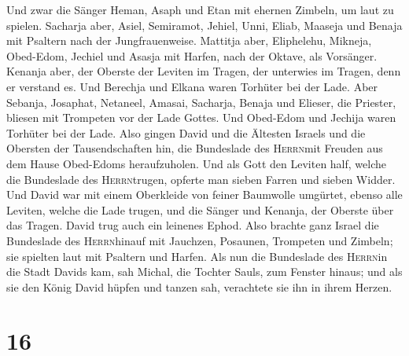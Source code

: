  Und zwar die Sänger Heman, Asaph und Etan mit ehernen
Zimbeln, um laut zu spielen.  Sacharja aber, Asiel,
Semiramot, Jehiel, Unni, Eliab, Maaseja und Benaja mit Psaltern nach der
Jungfrauenweise.  Mattitja aber, Eliphelehu, Mikneja,
Obed-Edom, Jechiel und Asasja mit Harfen, nach der Oktave, als
Vorsänger.  Kenanja aber, der Oberste der Leviten im
Tragen, der unterwies im Tragen, denn er verstand es. 
Und Berechja und Elkana waren Torhüter bei der Lade. 
Aber Sebanja, Josaphat, Netaneel, Amasai, Sacharja, Benaja und Elieser,
die Priester, bliesen mit Trompeten vor der Lade Gottes. Und Obed-Edom
und Jechija waren Torhüter bei der Lade.  Also gingen
David und die Ältesten Israels und die Obersten der Tausendschaften hin,
die Bundeslade des \textsc{Herrn}mit Freuden aus dem Hause Obed-Edoms
heraufzuholen.  Und als Gott den Leviten half, welche die
Bundeslade des \textsc{Herrn}trugen, opferte man sieben Farren und
sieben Widder.  Und David war mit einem Oberkleide von
feiner Baumwolle umgürtet, ebenso alle Leviten, welche die Lade trugen,
und die Sänger und Kenanja, der Oberste über das Tragen. David trug auch
ein leinenes Ephod.  Also brachte ganz Israel die
Bundeslade des \textsc{Herrn}hinauf mit Jauchzen, Posaunen, Trompeten
und Zimbeln; sie spielten laut mit Psaltern und Harfen. 
Als nun die Bundeslade des \textsc{Herrn}in die Stadt Davids kam, sah
Michal, die Tochter Sauls, zum Fenster hinaus; und als sie den König
David hüpfen und tanzen sah, verachtete sie ihn in ihrem Herzen.

\hypertarget{section-15}{%
\section{16}\label{section-15}}

